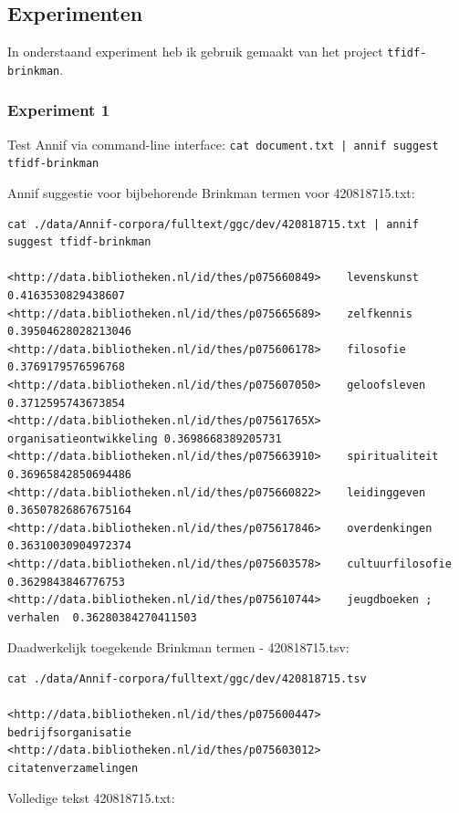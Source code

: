 \documentclass{article}
\begin{document}

\subsection{Experimenten}
In onderstaand experiment heb ik gebruik gemaakt van het project \texttt{tfidf-brinkman}.

\subsubsection{Experiment 1} 

Test Annif via command-line interface: \texttt{cat document.txt | annif suggest tfidf-brinkman}

Annif suggestie voor bijbehorende Brinkman termen voor 420818715.txt:

\begin{lstlisting}
cat ./data/Annif-corpora/fulltext/ggc/dev/420818715.txt | annif suggest tfidf-brinkman

<http://data.bibliotheken.nl/id/thes/p075660849>	levenskunst	0.4163530829438607
<http://data.bibliotheken.nl/id/thes/p075665689>	zelfkennis	0.39504628028213046
<http://data.bibliotheken.nl/id/thes/p075606178>	filosofie	0.3769179576596768
<http://data.bibliotheken.nl/id/thes/p075607050>	geloofsleven	0.3712595743673854
<http://data.bibliotheken.nl/id/thes/p07561765X>	organisatieontwikkeling	0.3698668389205731
<http://data.bibliotheken.nl/id/thes/p075663910>	spiritualiteit	0.36965842850694486
<http://data.bibliotheken.nl/id/thes/p075660822>	leidinggeven	0.36507826867675164
<http://data.bibliotheken.nl/id/thes/p075617846>	overdenkingen	0.36310030904972374
<http://data.bibliotheken.nl/id/thes/p075603578>	cultuurfilosofie	0.3629843846776753
<http://data.bibliotheken.nl/id/thes/p075610744>	jeugdboeken ; verhalen	0.36280384270411503
\end{lstlisting}

Daadwerkelijk toegekende Brinkman termen - 420818715.tsv:

\begin{lstlisting}
cat ./data/Annif-corpora/fulltext/ggc/dev/420818715.tsv

<http://data.bibliotheken.nl/id/thes/p075600447>	bedrijfsorganisatie
<http://data.bibliotheken.nl/id/thes/p075603012>	citatenverzamelingen
\end{lstlisting}


Volledige tekst 420818715.txt:
\end{document}
